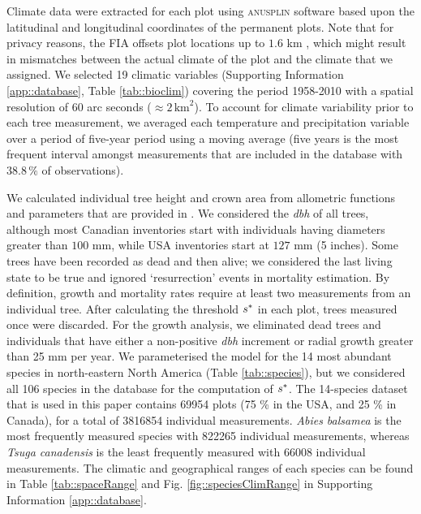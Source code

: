 Climate data were extracted for each plot using \textsc{anusplin} software \citep{McKenney2011} based upon the latitudinal and longitudinal coordinates of the permanent plots. Note that for privacy reasons, the FIA offsets plot locations up to $ 1.6 $ km \citep{Gray2012}, which might result in mismatches between the actual climate of the plot and the climate that we assigned. We selected 19 climatic variables (Supporting Information \ref{app::database}, Table \ref{tab::bioclim}) covering the period 1958-2010 with a spatial resolution of 60 arc seconds ($ \approx 2 \, \text{km}^2 $). To account for climate variability prior to each tree measurement, we averaged each temperature and precipitation variable over a period of five-year period using a moving average (five years is the most frequent interval amongst measurements that are included in the database with $ 38.8 \, \% $ of observations).

We calculated individual tree height and crown area from allometric functions and parameters that are provided in \citet{Purves2007}. We considered the \textit{dbh} of all trees, although most Canadian inventories start with individuals having diameters greater than $ 100 $ mm, while USA inventories start at $ 127 $ mm (5 inches). Some trees have been recorded as dead and then alive; we considered the last living state to be true and ignored `resurrection' events in mortality estimation. By definition, growth and mortality rates require at least two measurements from an individual tree. After calculating the threshold $ {s}^{*} $ in each plot, trees measured once were discarded. For the growth analysis, we eliminated dead trees and individuals that have either a non-positive \textit{dbh} increment or radial growth greater than 25 mm per year. We parameterised the model for the 14 most abundant species in north-eastern North America (Table \ref{tab::species}), but we considered all 106 species in the database for the computation of $ {s}^{*} $. The 14-species dataset that is used in this paper contains \num{69954} plots (75 \% in the USA, and 25 \% in Canada), for a total of \num{3816854} individual measurements. \textit{Abies balsamea} is the most frequently measured species with \num{822265} individual measurements, whereas \textit{Tsuga canadensis} is the least frequently measured with \num{66008} individual measurements. The climatic and geographical ranges of each species can be found in Table \ref{tab::spaceRange} and Fig. \ref{fig::speciesClimRange} in Supporting Information \ref{app::database}.

